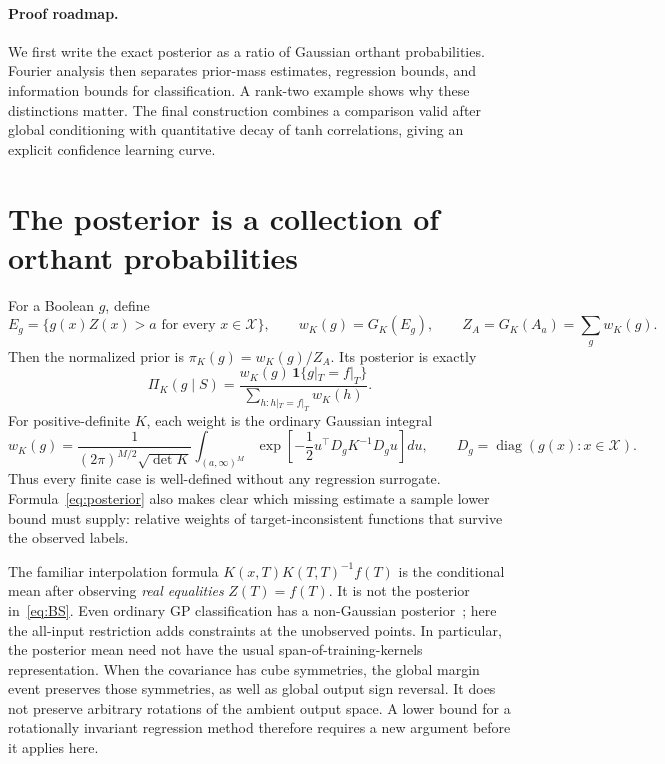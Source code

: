 \documentclass[11pt]{article}
\theoremstyle{remark}\newtheorem{remark}[theorem]{Remark}
\newcommand{\X}{\mathcal X}
\DeclareMathOperator{\diag}{diag}
\begin{document}
\paragraph{Proof roadmap.}
We first write the exact posterior as a ratio of Gaussian orthant
probabilities. Fourier analysis then separates prior-mass estimates,
regression bounds, and information bounds for classification. A rank-two
example shows why these distinctions matter. The final construction
combines a comparison valid after global conditioning with quantitative
decay of tanh correlations, giving an explicit confidence learning curve.

\section{The posterior is a collection of orthant probabilities}\label{sec:exact}
For a Boolean $g$, define
\[
 E_g=\{g(x)Z(x)>a\text{ for every }x\in\X\},\qquad
 w_K(g)=G_K(E_g),\qquad Z_A=G_K(A_a)=\sum_g w_K(g).
\]
Then the normalized prior is $\pi_K(g)=w_K(g)/Z_A$. Its posterior is exactly
\begin{equation}\label{eq:posterior}
 \Pi_K(g\mid S)=
 \frac{w_K(g)\,\mathbf1\{g|_T=f|_T\}}
 {\displaystyle\sum_{h:h|_T=f|_T}w_K(h)}.
\end{equation}
For positive-definite $K$, each weight is the ordinary Gaussian integral
\begin{equation}\label{eq:orthant}
 w_K(g)=\frac{1}{(2\pi)^{M/2}\sqrt{\det K}}
 \int_{(a,\infty)^M}
 \exp\!\left[-\frac12u^\top D_gK^{-1}D_gu\right]du,
 \qquad D_g=\diag(g(x):x\in\X).
\end{equation}
Thus every finite case is well-defined without any regression surrogate. Formula~\eqref{eq:posterior} also makes clear which missing estimate a sample lower bound must supply: relative weights of target-inconsistent functions that survive the observed labels.

The familiar interpolation formula $K(x,T)K(T,T)^{-1}f(T)$ is the conditional mean after observing \emph{real equalities} $Z(T)=f(T)$. It is not the posterior in~\eqref{eq:BS}. Even ordinary GP classification has a non-Gaussian posterior~\cite{gpml}; here the all-input restriction adds constraints at the unobserved points. In particular, the posterior mean need not have the usual span-of-training-kernels representation. When the covariance has cube symmetries, the global margin event preserves those symmetries, as well as global output sign reversal. It does not preserve arbitrary rotations of the ambient output space. A lower bound for a rotationally invariant regression method therefore requires a new argument before it applies here.
\end{document}
